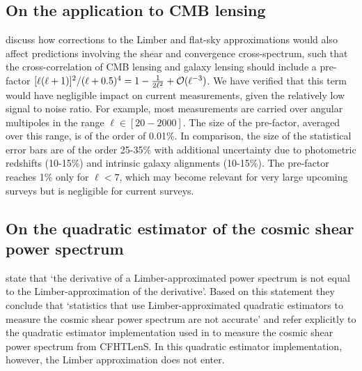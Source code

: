 \subsection{On the application to CMB lensing}
\citet{kitching/etal:2016} discuss how corrections to the Limber and flat-sky approximations would also affect predictions involving the shear and convergence cross-spectrum, such that the cross-correlation of CMB lensing and galaxy lensing should include a pre-factor $ [\ell(\ell+1)]^2/(\ell+ 0.5)^4 = 1-{1\over 2\ell^2}+{\cal O}(\ell^{-3})$.   We have verified that this term would have negligible impact on current measurements, given the relatively low signal to noise ratio.  For example, most measurements \citep{hand/etal:2015, liu/hill:2015, kirk/etal:2016,harnois-deraps/etal:2016} are carried over angular multipoles in the range $\ell \in [20-2000]$.  The size of the pre-factor, averaged over this range, is of the order of 0.01\%. In comparison, the size of the statistical error bars are of the order 25-35\% with additional uncertainty due to photometric redshifts (10-15\%) and intrinsic galaxy alignments (10-15\%). The pre-factor reaches 1\% only for $\ell < 7$, which may become relevant for very large upcoming surveys but is negligible for current surveys. 

\subsection{On the quadratic estimator of the cosmic shear power spectrum}

\citet{kitching/etal:2016} state that `the derivative of a Limber-approximated power spectrum is not equal to the Limber-approximation of the derivative'. Based on this statement they conclude that `statistics that use Limber-approximated quadratic estimators to measure the cosmic shear power spectrum are not accurate' and refer explicitly to the quadratic estimator implementation used in \citet{Koehlinger2016} to measure the cosmic shear power spectrum from CFHTLenS. In this quadratic estimator implementation, however, the Limber approximation does not enter. 

